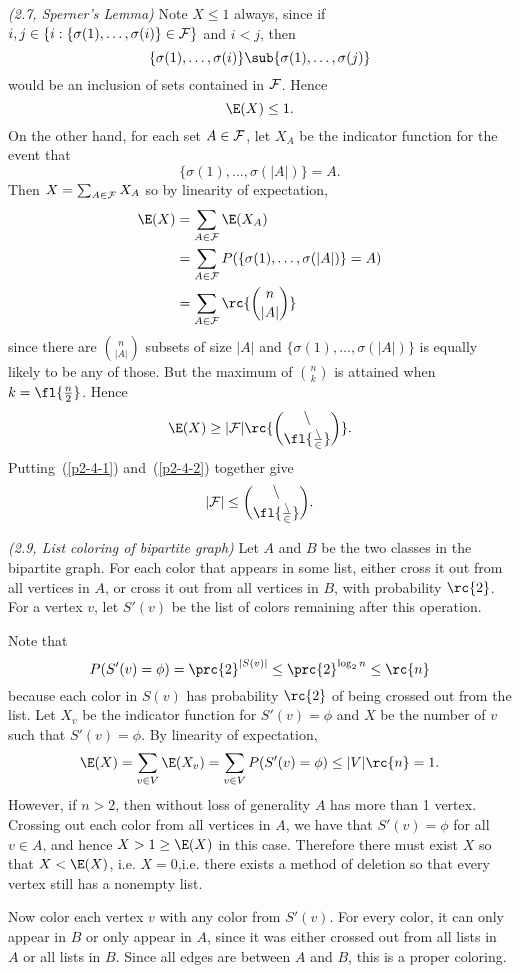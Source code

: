 \begin{problem} {\it (2.7, Sperner's Lemma)}
Note $X\leq 1$ always, since if $i,j\in \{i:\{\sigma(1),\ldots, \sigma(i)\}\in \cal F\}$ and $i<j$, then
\[
\{\sigma(1),\ldots, \sigma(i)\}\sub\{\sigma(1),\ldots, \sigma(j)\}
\]
would be an inclusion of sets contained in $\cal F$. Hence
\begin{equation}\label{p2-4-1}
\E(X)\leq 1.
\end{equation}
On the other hand, for each set $A\in \cal F$, let $X_A$ be the indicator function for the event that
\[
\{\sigma(1),\ldots, \sigma(|A|)\}=A.
\]
Then $X=\sum_{A\in \cal F}X_A$ so by linearity of expectation,
\begin{align*}
\E(X)&=\sum_{A\in \cal F} \E(X_A)\\
&=\sum_{A\in \cal F}P(\{\sigma(1),\ldots, \sigma(|A|)\}=A)\\
&=\sum_{A\in \cal F}\rc{\binom{n}{|A|}}
\end{align*}
since there are $\binom{n}{|A|}$ subsets of size $|A|$ and $\{\sigma(1),\ldots, \sigma(|A|)\}$ is equally likely to be any of those. But the maximum of $\binom{n}{k}$ is attained when $k=\fl{\frac n2}$. Hence
\begin{equation}\label{p2-4-2}
\E(X)\geq |\cal F|\rc{\binom{n}{\fl{\frac n2}}}.
\end{equation}
Putting~(\ref{p2-4-1}) and~(\ref{p2-4-2}) together give
\[
|\cal F|\leq \binom{n}{\fl{\frac n2}}.
\]
\end{problem}
\begin{problem} {\it (2.9, List coloring of bipartite graph)}
Let $A$ and $B$ be the two classes in the bipartite graph. 
For each color that appears in some list, either cross it out from all vertices in $A$, or cross it out from all vertices in $B$, with probability $\rc{2}$. For a vertex $v$, let $S'(v)$ be the list of colors remaining after this operation.

Note that
\[
P(S'(v)=\phi)=\prc{2}^{|S(v)|}\leq \prc{2}^{\log_2 n}\leq \rc{n}\]
because each color in $S(v)$ has probability $\rc{2}$ of being crossed out from the list. Let $X_v$ be the indicator function for $S'(v)=\phi$ and $X$ be the number of $v$ such that $S'(v)=\phi$. By linearity of expectation,
\[
\E(X)=\sum_{v\in V}\E(X_v)=\sum_{v\in V}P(S'(v)=\phi)\leq |V|\rc{n}=1.
\]
However, if $n>2$, then without loss of generality $A$ has more than 1 vertex. Crossing out each color from all vertices in $A$, we have that $S'(v)=\phi$ for all $v\in A$, and hence $X>1\geq \E(X)$ in this case. Therefore there must exist $X$ so that $X<\E(X)$, i.e. $X=0$,i.e. there exists a method of deletion so that every vertex still has a nonempty list.

Now color each vertex $v$ with any color from $S'(v)$. For every color, it can only appear in $B$ or only appear in $A$, since it was either crossed out from all lists in $A$ or all lists in $B$. Since all edges are between $A$ and $B$, this is a proper coloring.
\end{problem}

